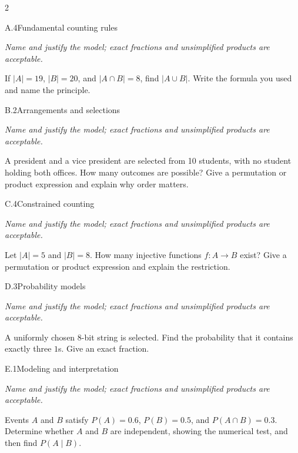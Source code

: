 \documentclass[9pt]{extarticle}
\begin{document}
\CoreWorkArea
\FormBreak
{}
\begin{multicols}{2}
\begin{CoreProblem}{A.4}{Fundamental counting rules}
{\scriptsize\textit{Name and justify the model; exact fractions and unsimplified products are acceptable.}\par}
If $|A|=19$, $|B|=20$, and $|A\cap B|=8$, find $|A\cup B|$. Write
    the formula you used and name the principle.
\end{CoreProblem}
\begin{CoreProblem}{B.2}{Arrangements and selections}
{\scriptsize\textit{Name and justify the model; exact fractions and unsimplified products are acceptable.}\par}
A president and a vice president are selected from 10 students, with
    no student holding both offices. How many outcomes are possible? Give a
    permutation or product expression and explain why order matters.
\end{CoreProblem}
\begin{CoreProblem}{C.4}{Constrained counting}
{\scriptsize\textit{Name and justify the model; exact fractions and unsimplified products are acceptable.}\par}
Let $|A|=5$ and $|B|=8$. How many injective functions $f:A\to B$
    exist? Give a permutation or product expression and explain the restriction.
\end{CoreProblem}
\columnbreak
\begin{CoreProblem}{D.3}{Probability models}
{\scriptsize\textit{Name and justify the model; exact fractions and unsimplified products are acceptable.}\par}
A uniformly chosen 8-bit string is selected. Find the probability
    that it contains exactly three $1$s. Give an exact fraction.
\end{CoreProblem}
\begin{CoreProblem}{E.1}{Modeling and interpretation}
{\scriptsize\textit{Name and justify the model; exact fractions and unsimplified products are acceptable.}\par}
Events $A$ and $B$ satisfy $P(A)=0.6$, $P(B)=0.5$, and
    $P(A\cap B)=0.3$. Determine whether $A$ and $B$ are independent, showing
    the numerical test, and then find $P(A\mid B)$.
\end{CoreProblem}
\end{multicols}
\CoreWorkArea
\FormBreak
{}
\end{document}

